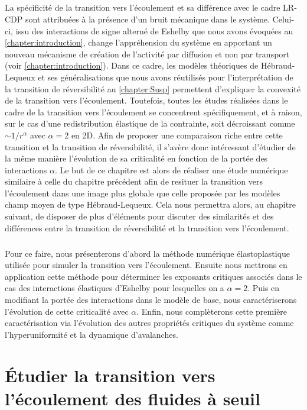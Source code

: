 \subparagraph{}La spécificité de la transition vers l'écoulement et sa différence avec le cadre LR-CDP sont attribuées à la présence d'un bruit mécanique dans le système. Celui-ci, issu des interactions de signe alterné de Eshelby que nous avons évoquées au \autoref{chapter:introduction}, change l'appréhension du système en apportant un nouveau mécanisme de création de l'activité par diffusion et non par transport (voir \autoref{chapter:introduction}). Dans ce cadre, les modèles théoriques de Hébraud-Lequeux et ses généralisations que nous avons réutilisés pour l'interprétation de la transition de réversibilité au  \autoref{chapter:Susp} permettent d'expliquer la convexité de la transition vers l'écoulement. Toutefois, toutes les études réalisées dans le cadre de la transition vers l'écoulement se concentrent spécifiquement, et à raison, sur le cas d'une redistribution élastique de la contrainte, soit décroissant comme $\sim 1/r^\alpha$ avec $\alpha = 2$ en 2D. Afin de proposer une comparaison riche entre cette transition et la transition de réversibilité, il s'avère donc intéressant d'étudier de la même manière l'évolution de sa criticalité en fonction de la portée des interactions $\alpha$. Le but de ce chapitre est alors de réaliser une étude numérique similaire à celle du chapitre précédent afin de resituer la transition vers l'écoulement dans une image plus globale que celle proposée par les modèles champ moyen de type Hébraud-Lequeux. Cela nous permettra alors, au chapitre suivant, de disposer de plus d'éléments pour discuter des similarités et des différences entre la transition de réversibilité et la transition vers l'écoulement.

\subparagraph{}Pour ce faire, nous présenterons d'abord la méthode numérique élastoplastique utilisée pour simuler la transition vers l'écoulement. Ensuite nous mettrons en application cette méthode pour déterminer les exposants critiques associés dans le cas des interactions élastiques d'Eshelby pour lesquelles on a $\alpha=2$. Puis en modifiant la portée des interactions dans le modèle de base, nous caractériserons l'évolution de cette criticalité avec $\alpha$. Enfin, nous complèterons cette première caractérisation via l'évolution des autres propriétés critiques du système comme l'hyperuniformité et la dynamique d'avalanches.

\section{Étudier la transition vers l'écoulement des fluides à seuil}

